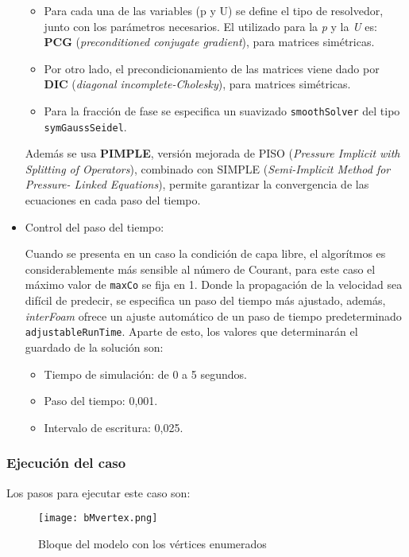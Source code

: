 \begin{itemize}
  \begin{itemize}
  \item
    Para cada una de las variables (p y U) se define el tipo de
    resolvedor, junto con los parámetros necesarios. El utilizado para
    la \emph{p} y la \emph{U} es: \textbf{PCG} (\emph{preconditioned
    conjugate gradient}), para matrices simétricas.
  \item
    Por otro lado, el precondicionamiento de las matrices viene dado por
    \textbf{DIC} (\emph{diagonal incomplete-Cholesky}), para matrices
    simétricas.
  \item
    Para la fracción de fase se especifica un suavizado
    \texttt{smoothSolver} del tipo \texttt{symGaussSeidel}.
  \end{itemize}

  Además se usa \textbf{PIMPLE}, versión mejorada de PISO
  (\emph{Pressure Implicit with Splitting of Operators}), combinado con
  SIMPLE (\emph{Semi-Implicit Method for Pressure- Linked Equations}),
  permite garantizar la convergencia de las ecuaciones en cada paso del
  tiempo.
\item
  Control del paso del tiempo:

  Cuando se presenta en un caso la condición de capa libre, el
  algorítmos es considerablemente más sensible al número de Courant,
  para este caso el máximo valor de \texttt{maxCo} se fija en 1. Donde
  la propagación de la velocidad sea difícil de predecir, se especifica
  un paso del tiempo más ajustado, además, \emph{interFoam} ofrece un
  ajuste automático de un paso de tiempo predeterminado
  \texttt{adjustableRunTime}. Aparte de esto, los valores que
  determinarán el guardado de la solución son:

  \begin{itemize}
  \item
    Tiempo de simulación: de 0 a 5 segundos.
  \item
    Paso del tiempo: 0,001.
  \item
    Intervalo de escritura: 0,025.
  \end{itemize}
\end{itemize}

\subsubsection{Ejecución del caso}\label{header-n645}

Los pasos para ejecutar este caso son:

\begin{figure}[hb]
\centering
\texttt{[image: bMvertex.png]}
\caption{Bloque del modelo con los vértices enumerados}
\label{fig:bMvertex}
\end{figure}

